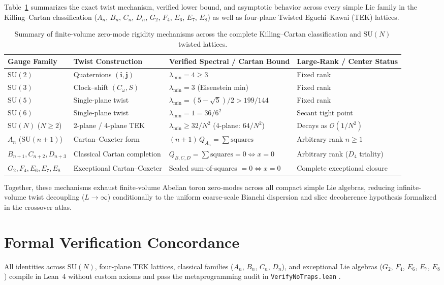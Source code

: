 \documentclass[11pt,a4paper]{article}
\newcommand{\SU}{\mathrm{SU}}
\begin{document}
Table~\ref{tab:group-comparison} summarizes the exact twist mechanism, verified lower bound, and asymptotic behavior across every simple Lie family in the Killing--Cartan classification ($A_n$, $B_n$, $C_n$, $D_n$, $G_2$, $F_4$, $E_6$, $E_7$, $E_8$) as well as four-plane Twisted Eguchi--Kawai (TEK) lattices.

\begin{table}[ht]
\centering
\scriptsize
\begin{tabular}{@{}llll@{}}
\toprule
Gauge Family & Twist Construction & Verified Spectral / Cartan Bound & Large-Rank / Center Status \\
\midrule
$\SU(2)$ & Quaternions $(\mathbf{i}, \mathbf{j})$ & $\lambda_{\min} = 4 \ge 3$ & Fixed rank \\
$\SU(3)$ & Clock--shift $(C_\omega, S)$ & $\lambda_{\min} = 3$ (Eisenstein min) & Fixed rank \\
$\SU(5)$ & Single-plane twist & $\lambda_{\min} = (5-\sqrt{5})/2 > 199/144$ & Fixed rank \\
$\SU(6)$ & Single-plane twist & $\lambda_{\min} = 1 = 36/6^2$ & Secant tight point \\
$\SU(N)$ ($N \ge 2$) & 2-plane / 4-plane TEK & $\lambda_{\min} \ge 32/N^2$ (4-plane: $64/N^2$) & Decays as $\mathcal{O}(1/N^2)$ \\
$A_n$ ($\SU(n+1)$) & Cartan--Coxeter form & $(n+1)\, Q_{A_n} = \sum \text{squares}$ & Arbitrary rank $n \ge 1$ \\
$B_{n+1}, C_{n+2}, D_{n+3}$ & Classical Cartan completion & $Q_{B,C,D} = \sum \text{squares} = 0 \Leftrightarrow x=0$ & Arbitrary rank ($D_4$ triality) \\
$G_2, F_4, E_6, E_7, E_8$ & Exceptional Cartan--Coxeter & Scaled sum-of-squares $= 0 \Leftrightarrow x=0$ & Complete exceptional closure \\
\bottomrule
\end{tabular}
\caption{Summary of finite-volume zero-mode rigidity mechanisms across the complete Killing--Cartan classification and $\SU(N)$ twisted lattices.}
\label{tab:group-comparison}
\end{table}

Together, these mechanisms exhaust finite-volume Abelian toron zero-modes across all compact simple Lie algebras, reducing infinite-volume twist decoupling ($L \to \infty$) conditionally to the uniform coarse-scale Bianchi dispersion and slice decoherence hypothesis formalized in the crossover atlas.

\section{Formal Verification Concordance}
All identities across $\SU(N)$, four-plane TEK lattices, classical families ($A_n$, $B_n$, $C_n$, $D_n$), and exceptional Lie algebras ($G_2$, $F_4$, $E_6$, $E_7$, $E_8$) compile in Lean~4 without custom axioms and pass the metaprogramming audit in \texttt{VerifyNoTraps.lean} \cite{Mathlib4}.
\end{document}
